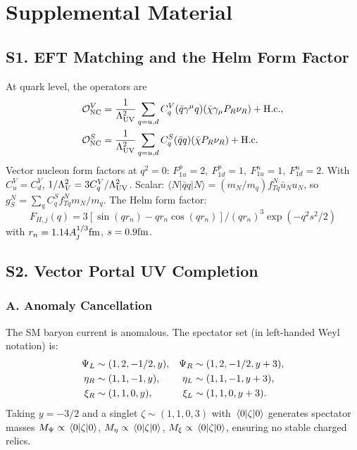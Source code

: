 \documentclass[aps,twocolumn,superscriptaddress,groupedaddress,nofootinbib,floatfix]{revtex4}
\begin{document}

\clearpage
\onecolumngrid

\section*{Supplemental Material}

\subsection*{S1. EFT Matching and the Helm Form Factor}

At quark level, the operators are
\begin{align}
\mathcal{O}_{\rm NC}^V&=\frac{1}{\Lambda_{\rm UV}^2}\sum_{q=u,d}C_q^V(\bar q\gamma^\mu q)(\bar\chi\gamma_\mu P_R\nu_R)+\mathrm{H.c.},\\
\mathcal{O}_{\rm NC}^S&=\frac{1}{\Lambda_{\rm UV}^2}\sum_{q=u,d}C_q^S(\bar qq)(\bar\chi P_R\nu_R)+\mathrm{H.c.}
\end{align}
Vector nucleon form factors at $q^2=0$: $F_{1u}^p=2,\ F_{1d}^p=1,\ F_{1u}^n=1,\ F_{1d}^n=2$. With $C_u^V=C_d^V$, $1/\Lambda_V^2=3C_q^V/\Lambda_{\rm UV}^2$. Scalar: $\langle N|\bar qq|N\rangle=(m_N/m_q)f_{Tq}^N\bar u_Nu_N$, so $g_S^N=\sum_q C_q^S f_{Tq}^N m_N/m_q$. 
The Helm form factor: 
\begin{equation}
    F_{H,j}(q)=3[\sin(qr_n)-qr_n\cos(qr_n)]/(qr_n)^3\exp(-q^2s^2/2) 
\end{equation}
with $r_n=1.14A_j^{1/3}\rm fm$, $s=0.9\rm fm$.

\subsection*{S2. Vector Portal UV Completion}

\subsubsection*{A. Anomaly Cancellation}
The SM baryon current is anomalous. The spectator set (in left-handed Weyl notation) is:
\begin{align}
\Psi_L&\sim(1,2,-1/2,y),& \Psi_R&\sim(1,2,-1/2,y+3), \notag \\
\eta_R&\sim(1,1,-1,y),& \eta_L&\sim(1,1,-1,y+3), \notag \\
\xi_R&\sim(1,1,0,y),& \xi_L&\sim(1,1,0,y+3). \notag
\end{align}
Taking $y=-3/2$ and a singlet $\zeta\sim(1,1,0,3)$ with $\vev{\zeta}$ generates spectator masses $M_\Psi\propto\vev{\zeta}$, $M_\eta\propto\vev{\zeta}$, $M_\xi\propto\vev{\zeta}$, ensuring no stable charged relics.
\end{document}
